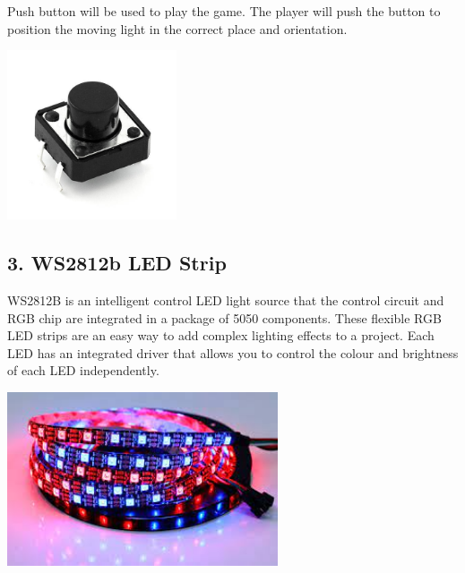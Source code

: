 \documentclass[12pt]{article}
\begin{document}
\begin{flushleft}
Push button will be used to play the game. The player will push the button to position the moving light in the correct place and orientation.
\end{flushleft}

\centering
\includegraphics[width=5cm]{pushbutton.jpg}


\begin{flushleft}
\subsection*{3. WS2812b LED Strip}
\end{flushleft}
\begin{flushleft}
WS2812B is an intelligent control LED light source that the control circuit and RGB chip are integrated in a package of 5050 components. These flexible RGB LED strips are an easy way to add complex lighting effects to a project. Each LED has an integrated driver that allows you to control the colour and brightness of each LED independently.
\end{flushleft}

\centering
\includegraphics[width=8cm]{led.jpg}


\pagebreak
\end{document}

